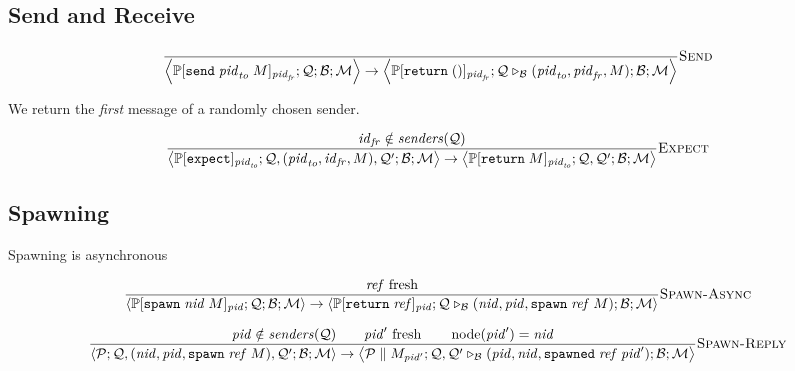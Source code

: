 \documentclass{article}
\newcommand{\sReturn}{\mathtt{return}}
\newcommand{\sExpect}{\mathtt{expect}}
\newcommand{\sSend}{\mathtt{send}}
\newcommand{\sSpawn}{\mathtt{spawn}}
\DeclareMathOperator{\sNodeOf}{node}
\newcommand{\sSpawned}{\mathtt{spawned}}
\newcommand{\sExtend}[1]{\mathrel{\triangleright_{#1}}}
\newcommand{\sPar}{\mathrel{\parallel}}
\newcommand{\sNid}{\ensuremath{\mathit{nid}}}
\newcommand{\sPid}{\ensuremath{\mathit{pid}}}
\newcommand{\sId}{\ensuremath{\mathit{id}}}
\newcommand{\sRef}{\ensuremath{\mathit{ref}}}
\newcommand{\sSystem}[4]{\left\langle #1 ; #2 ; #3 ; #4 \right\rangle}
\newcommand{\sQueue}{\mathcal{Q}}
\newcommand{\sProcesses}{\mathcal{P}}
\newcommand{\sBlacklist}{\mathcal{B}}
\newcommand{\sMonitors}{\mathcal{M}}
\newcommand{\sCtxt}[1]{\mathbb{#1}}
\newcommand{\sSenders}{\mathit{senders}}
\begin{document}
\subsection{Send and Receive}

\begin{equation*}
\frac{
}{
  \sSystem{\sCtxt{P}[ \sSend \; \sPid_\mathit{to} \; M ]_{\sPid_\mathit{fr}}}
          {\sQueue}
          {\sBlacklist}
          {\sMonitors}
\rightarrow 
  \sSystem{\sCtxt{P}[ \sReturn \; () ]_{\sPid_\mathit{fr}}}
          {\sQueue \sExtend{\sBlacklist} (\sPid_\mathit{to}, \sPid_\mathit{fr}, M)}
          {\sBlacklist}
          {\sMonitors}
} \textsc{Send}
\end{equation*}

We return the \emph{first} message of a randomly chosen sender.

\begin{equation*}
\frac{
  \sId_{\mathit{fr}} \notin \sSenders(\sQueue)
}{
  \sSystem{\sCtxt{P}[ \sExpect ]_{\sPid_\mathit{to}}}
          {\sQueue, (\sPid_\mathit{to}, \sId_\mathit{fr}, M), \sQueue'}
          {\sBlacklist}
          {\sMonitors}
\rightarrow
  \sSystem{\sCtxt{P}[ \sReturn \; M ]_{\sPid_\mathit{to}}}
          {\sQueue, \sQueue'}
          {\sBlacklist}
          {\sMonitors}
} \textsc{Expect}
\end{equation*}

\subsection{Spawning}

Spawning is asynchronous

\begin{equation*}
\frac{
  \sRef \text{ fresh} 
}{
  \sSystem{\sCtxt{P}[ \sSpawn \; \sNid \; M ]_\sPid}
          {\sQueue}
          {\sBlacklist}
          {\sMonitors}
\rightarrow          
  \sSystem{\sCtxt{P}[ \sReturn \; \sRef ]_\sPid}
          {\sQueue \sExtend{\sBlacklist} (\sNid, \sPid, \sSpawn \; \sRef \; M)}
          {\sBlacklist}
          {\sMonitors}
} \textsc{Spawn-Async}
\end{equation*}

\begin{equation*}
\frac{
  \sPid \notin \sSenders(\sQueue)
\qquad
  \sPid' \text{ fresh} 
\qquad
  \sNodeOf(\sPid') = \sNid
}{
  \sSystem{\sProcesses}
          {\sQueue, (\sNid, \sPid, \sSpawn \; \sRef \; M), \sQueue'}
          {\sBlacklist}
          {\sMonitors}
\rightarrow
  \sSystem{\sProcesses \sPar M_{\sPid'}}
          {\sQueue, \sQueue' \sExtend{\sBlacklist} (\sPid, \sNid, \sSpawned \; \sRef \; \sPid')}
          {\sBlacklist}
          {\sMonitors}
} \textsc{Spawn-Reply}
\end{equation*}
\end{document}
